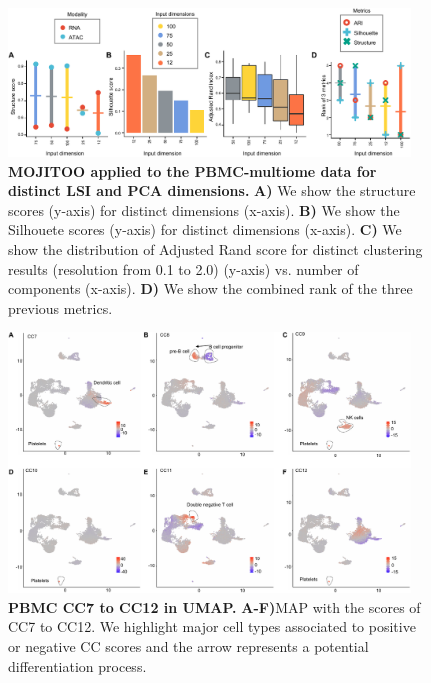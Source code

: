 \begin{figure}[!ht]
	\centering
	\includegraphics[width=0.95\textwidth]{Input_Dimensions/fig}
	\vspace{0.1cm}
	\caption[Input dimensions affection]{\textbf{MOJITOO applied to the PBMC-multiome data for distinct LSI and PCA dimensions.} \textbf{A)} We show the structure scores (y-axis) for distinct dimensions (x-axis). \textbf{B)} We show the Silhouete scores (y-axis) for distinct dimensions (x-axis). \textbf{C)} We show the distribution of Adjusted Rand score for distinct clustering results (resolution from 0.1 to 2.0) (y-axis) vs. number
of components (x-axis). \textbf{D)} We show the combined rank of the three previous metrics.}
	\label{fig:Input_Dimensions}
\end{figure}



\begin{figure}[!ht]
  \centering
  \includegraphics[width=0.95\textwidth]{Supp_CC_UMAP/fig}
  \vspace{0.1cm}
  \caption[PBMC CC7 to CC12 in UMAP]{\textbf{PBMC CC7 to CC12 in UMAP.} \textbf{A-F)}MAP with the scores of CC7 to CC12. We highlight major cell types associated to positive or negative CC scores and the arrow represents a potential differentiation process.}
  \label{fig:Supp_CC_UMAP}
\end{figure}


